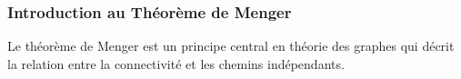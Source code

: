 \begin{frame}
\frametitle{Introduction au Théorème de Menger}
\begin{tcolorbox}[colback=orange!10,colframe=orange!100!black,
    title= Introduction]
    Le théorème de Menger est un principe central en théorie des graphes qui décrit la relation entre la connectivité et les chemins indépendants.
\end{tcolorbox}
\end{frame}


